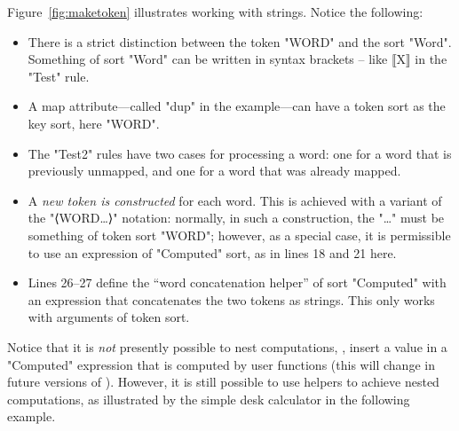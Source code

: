 \documentclass[12pt]{article} %
\newenvironment{figureunit}[1][]{\def\figureunitcaption{#1}}{\figureunitcaption}
\begin{document}
\begin{figure}[t]
  \begin{figureunit}[
      \caption{\emph{examples/MakeToken.hx}.}
      \label{fig:maketoken}
    ]
  \end{figureunit}
\end{figure}

\begin{example}
  Figure~\ref{fig:maketoken} illustrates working with strings. Notice the following:
  \begin{itemize}

  \item There is a strict distinction between the token "WORD" and the sort "Word". Something of
    sort "Word" can be written in syntax brackets -- like ⟦X⟧ in the "Test" rule.

  \item A map attribute---called "dup" in the example---can have a token sort as the key sort, here
    "WORD".

  \item The "Test2" rules have two cases for processing a word: one for a word that is previously
    unmapped, and one for a word that was already mapped.

  \item A \emph{new token is constructed} for each word. This is achieved with a variant of the
    "⟨WORD…⟩" notation: normally, in such a construction, the "…" must be something of token sort
    "WORD"; however, as a special case, it is permissible to use an expression of "Computed" sort,
    as in lines 18 and 21 here.

  \item Lines 26--27 define the ``word concatenation helper'' of sort "Computed" with an expression
    that concatenates the two tokens as strings. This only works with arguments of token sort.

  \end{itemize}
\end{example}

Notice that it is \emph{not} presently possible to nest computations, \ie, insert a value in a
"Computed" expression that is computed by user functions (this will change in future versions of
\HAX). However, it is still possible to use helpers to achieve nested computations, as illustrated
by the simple desk calculator in the following example.
\end{document}
